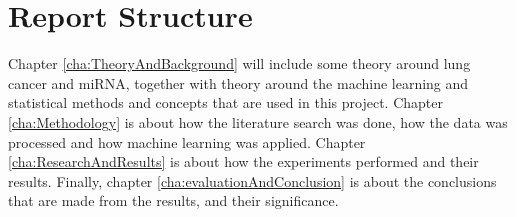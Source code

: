 \iffalse
\section{Contributions}
\label{sec:IntroContributions}

The main description of the contributions will come in chapter~\ref{cont} after the results are presented. This section just provides a brief summary of the main contributions of the work. This section can also be left out, leaving all discussions in chapter~\ref{cont}.

The format of this section will generally follow the following format:
{\it
Donec non turpis nec neque egestas faucibus nec id neque. Etiam consectetur, odio vitae gravida tempus, diam velit sagittis turpis, a molestie ligula tellus at nunc. Nam convallis consequat vestibulum. Proin dolor neque, dapibus a pellentesque a, commodo a nibh.}

\begin{enumerate}
\item {\it Lorem ipsum dolor sit amet, consectetur adipiscing elit.}
\item {\it Lorem ipsum dolor sit amet, consectetur adipiscing elit.}
\item {\it Lorem ipsum dolor sit amet, consectetur adipiscing elit.}
\end{enumerate}
\fi


\section{Report Structure}
\label{sec:thesisStructure}

Chapter \ref{cha:TheoryAndBackground} will include some theory around lung cancer and miRNA, together with theory around the machine learning and statistical methods and concepts that are used in this project. Chapter \ref{cha:Methodology} is about how the literature search was done, how the data was processed and how machine learning was applied. Chapter \ref{cha:ResearchAndResults} is about how the experiments performed and their results. Finally, chapter \ref{cha:evaluationAndConclusion} is about the conclusions that are made from the results, and their significance.

\iffalse
This section provides the reader with an overview of what is coming in the next chapters. You want to say more than what is explicit in the chapter name, if possible, but still keep the description short and to the point. 
\fi
